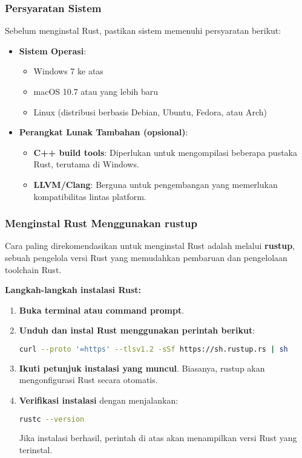 \subsubsection{Persyaratan Sistem}
Sebelum menginstal Rust, pastikan sistem memenuhi persyaratan berikut:
\begin{itemize}
	\item \textbf{Sistem Operasi}:
	\begin{itemize}
		\item Windows 7 ke atas
		\item macOS 10.7 atau yang lebih baru
		\item Linux (distribusi berbasis Debian, Ubuntu, Fedora, atau Arch)
	\end{itemize}
	\item \textbf{Perangkat Lunak Tambahan (opsional)}:
	\begin{itemize}
		\item \textbf{C++ build tools}: Diperlukan untuk mengompilasi beberapa pustaka Rust, terutama di Windows.
		\item \textbf{LLVM/Clang}: Berguna untuk pengembangan yang memerlukan kompatibilitas lintas platform.
	\end{itemize}
\end{itemize}

\subsubsection{Menginstal Rust Menggunakan rustup}
Cara paling direkomendasikan untuk menginstal Rust adalah melalui \textbf{rustup}, sebuah pengelola versi Rust yang memudahkan pembaruan dan pengelolaan toolchain Rust.

\textbf{Langkah-langkah instalasi Rust:}
\begin{enumerate}
	\item \textbf{Buka terminal atau command prompt}.
	\item \textbf{Unduh dan instal Rust menggunakan perintah berikut}:
	\begin{lstlisting}[language=Bash]
		curl --proto '=https' --tlsv1.2 -sSf https://sh.rustup.rs | sh
	\end{lstlisting}
	\item \textbf{Ikuti petunjuk instalasi yang muncul}. Biasanya, rustup akan mengonfigurasi Rust secara otomatis.
	\item \textbf{Verifikasi instalasi} dengan menjalankan:
	\begin{lstlisting}[language=Bash]
		rustc --version
	\end{lstlisting}
	Jika instalasi berhasil, perintah di atas akan menampilkan versi Rust yang terinstal.
\end{enumerate}

